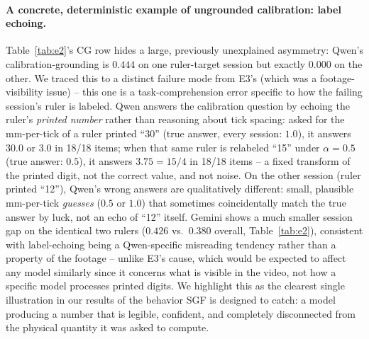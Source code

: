 \documentclass[11pt]{article}
\newcommand{\cg}{\mathrm{CG}}
\begin{document}
\paragraph{A concrete, deterministic example of ungrounded calibration: label
echoing.} Table~\ref{tab:e2}'s $\cg$ row hides a large, previously unexplained
asymmetry: Qwen's calibration-grounding is $0.444$ on one ruler-target session
but exactly $0.000$ on the other. We traced this to a distinct failure mode
from E3's (which was a footage-visibility issue) -- this one is a
task-comprehension error specific to how the failing session's ruler is
labeled. Qwen answers the calibration question by echoing the ruler's
\emph{printed number} rather than reasoning about tick spacing: asked for the
mm-per-tick of a ruler printed ``30'' (true answer, every session: $1.0$), it
answers $30.0$ or $3.0$ in 18/18 items; when that same ruler is relabeled
``15'' under $\alpha{=}0.5$ (true answer: $0.5$), it answers $3.75 = 15/4$ in
18/18 items -- a fixed transform of the printed digit, not the correct value,
and not noise. On the other session (ruler printed ``12''), Qwen's wrong
answers are qualitatively different: small, plausible mm-per-tick
\emph{guesses} ($0.5$ or $1.0$) that sometimes coincidentally match the true
answer by luck, not an echo of ``12'' itself. Gemini shows a much smaller
session gap on the identical two rulers ($0.426$ vs.\ $0.380$ overall,
Table~\ref{tab:e2}), consistent with label-echoing being a Qwen-specific
misreading tendency rather than a property of the footage -- unlike E3's
cause, which would be expected to affect any model similarly since it concerns
what is visible in the video, not how a specific model processes printed
digits. We highlight this as the clearest single illustration in our results
of the behavior SGF is designed to catch: a model producing a number that
is legible, confident, and completely disconnected from the physical
quantity it was asked to compute.
\end{document}
